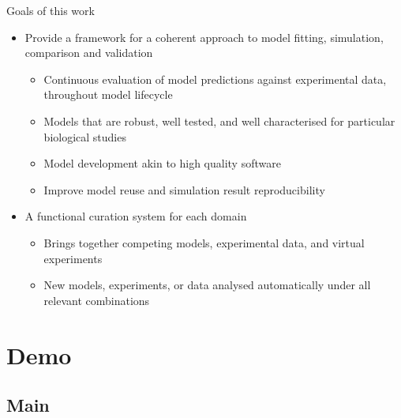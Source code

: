 \documentclass[t,xcolor={usenames,dvipsnames}]{beamer}
\begin{document}
\begin{frame}{Goals of this work}
\begin{itemize}[<+->]
\item Provide a framework for a coherent approach to model fitting, simulation, comparison and validation
  \begin{itemize}[<.->]
  \item Continuous evaluation of model predictions against experimental data, throughout model lifecycle
  \item Models that are robust, well tested, and well characterised for particular biological studies
  \item Model development akin to high quality software
  \item Improve model reuse and simulation result reproducibility
  \end{itemize}
\item A functional curation system \alert{for each domain}
  \begin{itemize}[<.->]
  \item Brings together competing models, experimental data, and virtual experiments
  \item New models, experiments, or data analysed automatically under all relevant combinations
  \end{itemize}
\end{itemize}
\end{frame}


\section{Demo}
\subsection*{Main}
\end{document}
